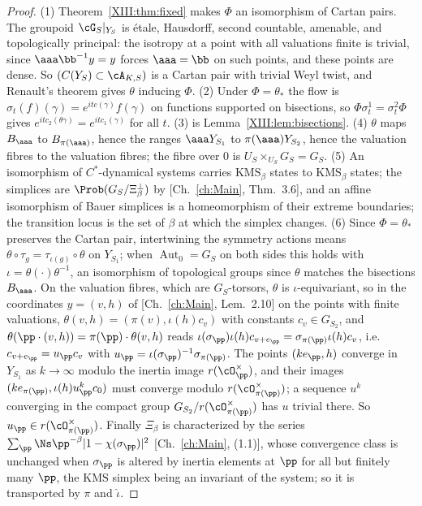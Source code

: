 \begin{proof}
(1) Theorem~\ref{XIII:thm:fixed} makes $\Phi$ an isomorphism of Cartan pairs. The groupoid
$\cG_S|_{Y_S}$ is \'etale, Hausdorff, second countable, amenable, and topologically
principal: the isotropy at a point with all valuations finite is trivial, since
$\aaa\bb^{-1}y=y$ forces $\aaa=\bb$ on such points, and these points are dense. So
$(C(Y_S)\subset\cA_{K,S})$ is a Cartan pair with trivial Weyl twist, and Renault's theorem
\cite{Renault} gives $\theta$ inducing $\Phi$. (2) Under $\Phi=\theta_*$ the flow is
$\sigma_t(f)(\gamma)=e^{itc(\gamma)}f(\gamma)$ on functions supported on bisections, so
$\Phi\sigma^1_t=\sigma^2_t\Phi$ gives $e^{itc_2(\theta\gamma)}=e^{itc_1(\gamma)}$ for all $t$.
(3) is Lemma~\ref{XIII:lem:bisections}. (4) $\theta$ maps $B_\aaa$ to $B_{\pi(\aaa)}$, hence the
ranges $\aaa Y_{S_1}$ to $\pi(\aaa)Y_{S_2}$, hence the valuation fibres to the valuation
fibres; the fibre over $0$ is $U_S\times_{U_S}G_S=G_S$. (5) An isomorphism of
$C^*$-dynamical systems carries $\mathrm{KMS}_\beta$ states to $\mathrm{KMS}_\beta$ states; the
simplices are $\Prob(G_S/\Xi_\beta^\perp)$ by [Ch.~\ref{ch:Main}, Thm.~3.6], and an affine isomorphism
of Bauer simplices is a homeomorphism of their extreme boundaries; the transition locus is
the set of $\beta$ at which the simplex changes. (6) Since $\Phi=\theta_*$ preserves the
Cartan pair, intertwining the symmetry actions means $\theta\circ\tau_g=\tau_{\iota(g)}\circ\theta$
on $Y_{S_1}$; when $\operatorname{Aut}_0=G_S$ on both sides this holds with
$\iota=\theta(\cdot)\theta^{-1}$, an isomorphism of topological groups since $\theta$ matches
the bisections $B_\aaa$. On the valuation fibres, which are $G_S$-torsors, $\theta$ is
$\iota$-equivariant, so in the coordinates $y=(v,h)$ of [Ch.~\ref{ch:Main}, Lem.~2.10] on the points
with finite valuations, $\theta(v,h)=(\pi(v),\iota(h)c_v)$ with constants $c_v\in G_{S_2}$, and
$\theta(\pp\cdot(v,h))=\pi(\pp)\cdot\theta(v,h)$ reads
$\iota(\sigma_\pp)\iota(h)c_{v+e_\pp}=\sigma_{\pi(\pp)}\iota(h)c_v$, i.e.\
$c_{v+e_\pp}=u_\pp c_v$ with $u_\pp=\iota(\sigma_\pp)^{-1}\sigma_{\pi(\pp)}$. The points
$(ke_\pp,h)$ converge in $Y_{S_1}$ as $k\to\infty$ modulo the inertia image $r(\cO_\pp^\times)$,
and their images $(ke_{\pi(\pp)},\iota(h)u_\pp^kc_0)$ must converge modulo
$r(\cO_{\pi(\pp)}^\times)$; a sequence $u^k$ converging in the compact group
$G_{S_2}/r(\cO_{\pi(\pp)}^\times)$ has $u$ trivial there. So $u_\pp\in r(\cO_{\pi(\pp)}^\times)$.
Finally $\Xi_\beta$ is characterized by the series $\sum_\pp\Ns\pp^{-\beta}|1-\chi(\sigma_\pp)|^2$
[Ch.~\ref{ch:Main}, (1.1)], whose convergence class is unchanged when $\sigma_\pp$ is altered by
inertia elements at $\pp$ for all but finitely many $\pp$, the $\mathrm{KMS}$ simplex being
an invariant of the system; so it is transported by $\pi$ and $\hat\iota$.
\end{proof}

